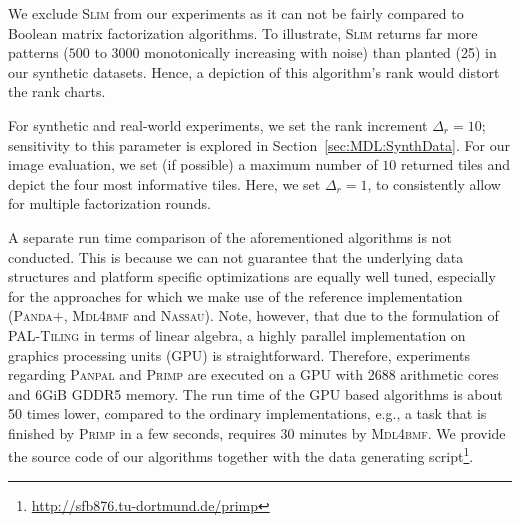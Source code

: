 We exclude \textsc{Slim} from our experiments as it can not be fairly compared to Boolean matrix factorization algorithms. To illustrate, \textsc{Slim} returns far more patterns ($500$ to $3000$ monotonically increasing with noise) than planted (25) in our synthetic datasets. Hence, a depiction of this algorithm's rank would distort the rank charts.

For synthetic and real-world experiments, we set the rank increment $\Delta_r=10$; sensitivity to this parameter is explored in Section~\ref{sec:MDL:SynthData}. For our image evaluation, we set (if possible) a maximum number of $10$ returned tiles and depict the four most informative tiles. Here, we set $\Delta_r=1$, to consistently allow for multiple factorization rounds. 

A separate run time comparison of the aforementioned algorithms is not conducted. This is because we can not guarantee that the underlying data structures and platform specific optimizations are equally well tuned, especially for the approaches for which we make use of the reference implementation (\textsc{Panda+}, \textsc{Mdl4bmf} and \textsc{Nassau}). Note, however, that due to the formulation of \textsc{PAL-Tiling} in terms of linear algebra, a highly parallel implementation on graphics processing units (GPU) is straightforward. Therefore, experiments regarding \textsc{Panpal} and \textsc{Primp} are executed on a GPU with 2688 arithmetic cores and 6GiB GDDR5 memory. The run time of the GPU based algorithms is about 50 times lower, compared to the ordinary implementations, e.g., a task that is finished by \textsc{Primp} in a few seconds, requires 30 minutes by \textsc{Mdl4bmf}. We provide the source code of our algorithms together with the data generating script\footnote{\url{http://sfb876.tu-dortmund.de/primp}}.
